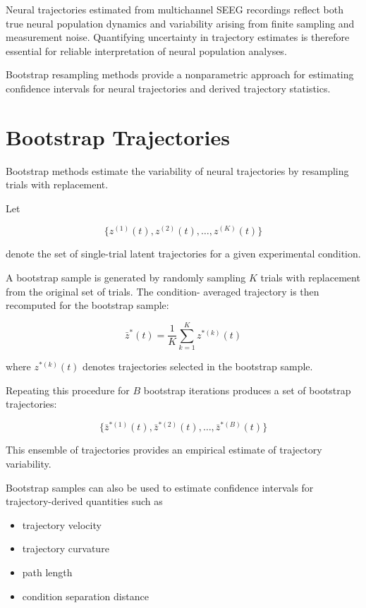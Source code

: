 \documentclass[11pt]{report}
\begin{document}
Neural trajectories estimated from multichannel SEEG recordings
reflect both true neural population dynamics and variability arising
from finite sampling and measurement noise. Quantifying uncertainty
in trajectory estimates is therefore essential for reliable
interpretation of neural population analyses.

Bootstrap resampling methods provide a nonparametric approach for
estimating confidence intervals for neural trajectories and derived
trajectory statistics.

\section{Bootstrap Trajectories}

Bootstrap methods estimate the variability of neural trajectories by
resampling trials with replacement.

Let

\begin{equation}
\{ z^{(1)}(t), z^{(2)}(t), \dots, z^{(K)}(t) \}
\end{equation}

denote the set of single-trial latent trajectories for a given
experimental condition.

A bootstrap sample is generated by randomly sampling $K$ trials
with replacement from the original set of trials. The condition-
averaged trajectory is then recomputed for the bootstrap sample:

\begin{equation}
\bar{z}^{*}(t) =
\frac{1}{K}
\sum_{k=1}^{K}
z^{*(k)}(t)
\end{equation}

where $z^{*(k)}(t)$ denotes trajectories selected in the bootstrap
sample.

Repeating this procedure for $B$ bootstrap iterations produces
a set of bootstrap trajectories:

\begin{equation}
\{ \bar{z}^{*(1)}(t), \bar{z}^{*(2)}(t), \dots, \bar{z}^{*(B)}(t) \}
\end{equation}

This ensemble of trajectories provides an empirical estimate of
trajectory variability.

Bootstrap samples can also be used to estimate confidence intervals
for trajectory-derived quantities such as

\begin{itemize}
\item trajectory velocity
\item trajectory curvature
\item path length
\item condition separation distance
\end{itemize}
\end{document}
